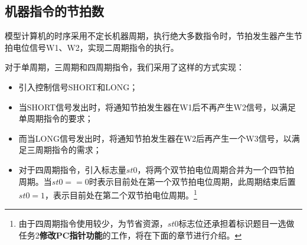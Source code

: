 \subsection{机器指令的节拍数}
\tec 模型计算机的时序采用不定长机器周期，执行绝大多数指令时，节拍发生器产生节拍电位信号W1、W2，实现二周期指令的执行。
\par
对于单周期，三周期和四周期指令，我们采用了这样的方式实现：
\begin{itemize}
    \item 引入控制信号SHORT和LONG；
    \item 当SHORT信号发出时，将通知节拍发生器在W1后不再产生W2信号，以满足单周期指令的要求；
    \item 而当LONG信号发出时，将通知节拍发生器在W2后再产生一个W3信号，以满足三周期指令的需求；
    \item 对于四周期指令，引入标志量$st0$，将两个双节拍电位周期合并为一个四节拍周期。当$st0==0$时表示目前处在第一个双节拍电位周期，此周期结束后置$st0=1$，表示目前处在第二个双节拍电位周期。\footnote{由于四周期指令使用较少，为节省资源，$st0$标志位还承担着标识题目一选做任务2\textbf{修改PC指针功能}的工作，将在下面的章节进行介绍。}
\end{itemize}